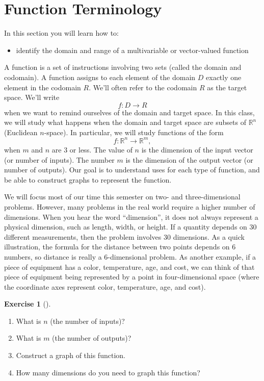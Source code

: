 \documentclass[10pt,]{book}
\theoremstyle{plain}
\theoremstyle{definition}
\theoremstyle{definition}
\theoremstyle{definition}
\theoremstyle{definition}
\newtheorem{exploration}[project]{Exercise}
\theoremstyle{definition}
\numberwithin{equation}{section}
\begin{document}
\section[{Function Terminology}]{Function Terminology}\label{section-15}
In this section you will learn how to: \leavevmode%
\begin{itemize}[label=\textbullet]
\item{}identify the domain and range of a multivariable or vector-valued function%
\end{itemize}
%
\par
A function is a set of instructions involving two sets (called the domain and codomain). A function assigns to each element of the domain \(D\) exactly one element in the codomain \(R\). We'll often refer to the codomain \(R\) as the target space. We'll write%
\begin{equation*}
f\colon D\to R
\end{equation*}
when we want to remind ourselves of the domain and target space. In this class, we will study what happens when the domain and target space are subsets of \({\mathbb{R}}^n\) (Euclidean \(n\)-space). In particular, we will study functions of the form%
\begin{equation*}
f\colon {\mathbb{R}}^n\to {\mathbb{R}}^m,
\end{equation*}
when \(m\) and \(n\) are 3 or less. The value of \(n\) is the dimension of the input vector (or number of inputs). The number \(m\) is the dimension of the output vector (or number of outputs). Our goal is to understand uses for each type of function, and be able to construct graphs to represent the function.%
\par
We will focus most of our time this semester on two- and three-dimensional problems. However, many problems in the real world require a higher number of dimensions. When you hear the word ``dimension'', it does not always represent a physical dimension, such as length, width, or height. If a quantity depends on 30 different measurements, then the problem involves 30 dimensions. As a quick illustration, the formula for the distance between two points depends on 6 numbers, so distance is really a 6-dimensional problem. As another example, if a piece of equipment has a color, temperature, age, and cost, we can think of that piece of equipment being represented by a point in four-dimensional space (where the coordinate axes represent color, temperature, age, and cost).%
\begin{exploration}[]\label{prob_pebble}
\leavevmode%
\begin{enumerate}[font=\bfseries,label=(\alph*),ref=\alph*]
\item\label{task-165} What is \(n\) (the number of inputs)?%
\item\label{task-166} What is \(m\) (the number of outputs)?%
\item\label{task-167} Construct a graph of this function.%
\item\label{task-168} How many dimensions do you need to graph this function?%
\end{enumerate}
\end{exploration}
\end{document}
